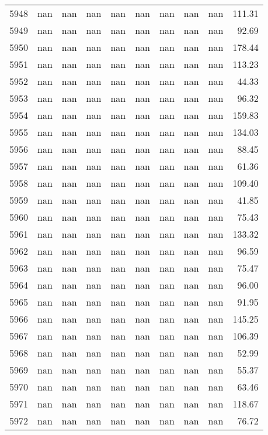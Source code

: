 \begin{tabular}{lrrrrrrrrr}
5948 & nan & nan & nan & nan & nan & nan & nan & nan & 111.31 \\
5949 & nan & nan & nan & nan & nan & nan & nan & nan & 92.69 \\
5950 & nan & nan & nan & nan & nan & nan & nan & nan & 178.44 \\
5951 & nan & nan & nan & nan & nan & nan & nan & nan & 113.23 \\
5952 & nan & nan & nan & nan & nan & nan & nan & nan & 44.33 \\
5953 & nan & nan & nan & nan & nan & nan & nan & nan & 96.32 \\
5954 & nan & nan & nan & nan & nan & nan & nan & nan & 159.83 \\
5955 & nan & nan & nan & nan & nan & nan & nan & nan & 134.03 \\
5956 & nan & nan & nan & nan & nan & nan & nan & nan & 88.45 \\
5957 & nan & nan & nan & nan & nan & nan & nan & nan & 61.36 \\
5958 & nan & nan & nan & nan & nan & nan & nan & nan & 109.40 \\
5959 & nan & nan & nan & nan & nan & nan & nan & nan & 41.85 \\
5960 & nan & nan & nan & nan & nan & nan & nan & nan & 75.43 \\
5961 & nan & nan & nan & nan & nan & nan & nan & nan & 133.32 \\
5962 & nan & nan & nan & nan & nan & nan & nan & nan & 96.59 \\
5963 & nan & nan & nan & nan & nan & nan & nan & nan & 75.47 \\
5964 & nan & nan & nan & nan & nan & nan & nan & nan & 96.00 \\
5965 & nan & nan & nan & nan & nan & nan & nan & nan & 91.95 \\
5966 & nan & nan & nan & nan & nan & nan & nan & nan & 145.25 \\
5967 & nan & nan & nan & nan & nan & nan & nan & nan & 106.39 \\
5968 & nan & nan & nan & nan & nan & nan & nan & nan & 52.99 \\
5969 & nan & nan & nan & nan & nan & nan & nan & nan & 55.37 \\
5970 & nan & nan & nan & nan & nan & nan & nan & nan & 63.46 \\
5971 & nan & nan & nan & nan & nan & nan & nan & nan & 118.67 \\
5972 & nan & nan & nan & nan & nan & nan & nan & nan & 76.72 \\

\end{tabular}
